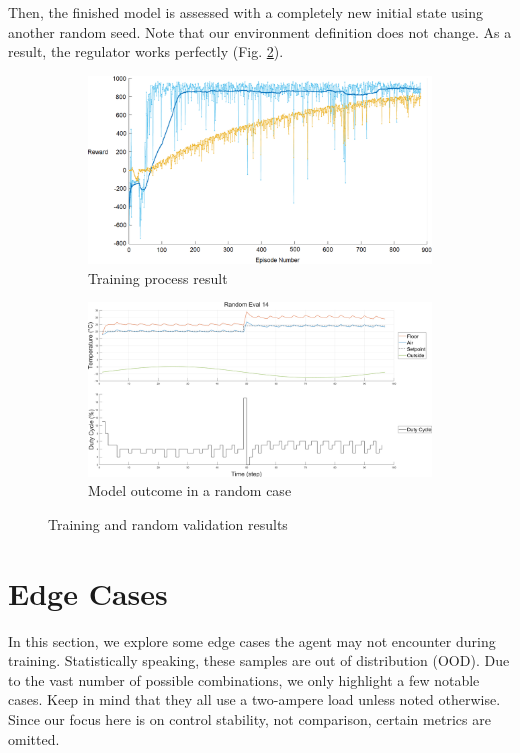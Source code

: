 \documentclass[../main.tex]{subfiles}
\begin{document}
Then, the finished model is assessed with a completely new initial state using another random seed. Note that our environment definition does not change. As a result, the regulator works perfectly (Fig. \ref{fig:val_result}).
\begin{figure}[htbp]
\centering
\begin{subfigure}{\textwidth}
    \includegraphics[width=\linewidth]{figures/final_result.png}
    \caption{Training process result}
    \label{fig:training_result}
\end{subfigure}
{}
\begin{subfigure}{\textwidth}
    \includegraphics[width=1\linewidth]{figures/RandomEval14.png}
    \caption{Model outcome in a random case}
    \label{fig:val_result}
\end{subfigure}
\caption{Training and random validation results}
\label{fig:train_val}
\end{figure}


\section{Edge Cases}
In this section, we explore some edge cases the agent may not encounter during training. Statistically speaking, these samples are out of distribution (OOD). Due to the vast number of possible combinations, we only highlight a few notable cases. Keep in mind that they all use a two-ampere load unless noted otherwise. Since our focus here is on control stability, not comparison, certain metrics are omitted.
\end{document}
